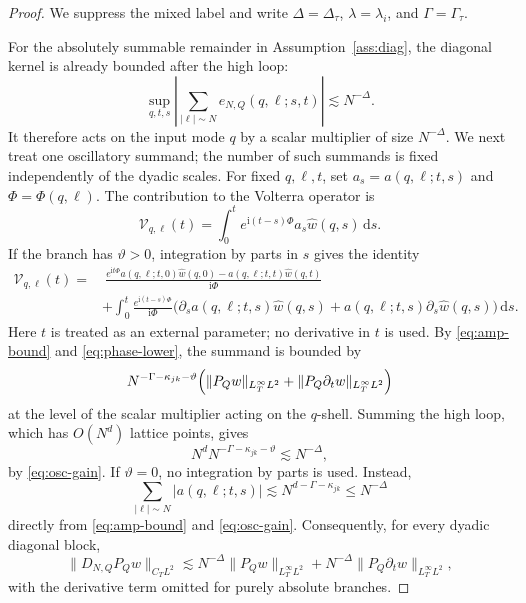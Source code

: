 \documentclass[11pt,reqno]{amsart}
\numberwithin{equation}{section}
\theoremstyle{plain}
\theoremstyle{definition}
\newcommand{\dd}{\,\mathrm d}
\newcommand{\ii}{\mathrm i}
\begin{document}
\begin{proof}
We suppress the mixed label and write \(\Delta=\Delta_\tau\), \(\lambda=\lambda_i\), and \(\Gamma=\Gamma_\tau\).

For the absolutely summable remainder in Assumption~\ref{ass:diag}, the diagonal kernel is already bounded after the high loop:
\begin{equation}\label{eq:D-rem-mult}
        \sup_{q,t,s}\left|\sum_{|\ell|\sim N}e_{N,Q}(q,\ell;s,t)\right|
        \lesssim N^{-\Delta}.
\end{equation}
It therefore acts on the input mode \(q\) by a scalar multiplier of size \(N^{-\Delta}\).  We next treat one oscillatory summand; the number of such summands is fixed independently of the dyadic scales.  For fixed \(q,\ell,t\), set \(a_s=a(q,\ell;t,s)\) and \(\Phi=\Phi(q,\ell)\).  The contribution to the Volterra operator is
\begin{equation}\label{eq:D-osc-one}
        \mathcal V_{q,\ell}(t)
        =\int_0^t e^{\ii(t-s)\Phi}a_s\widehat w(q,s)\dd s .
\end{equation}
If the branch has \(\vartheta>0\), integration by parts in \(s\) gives the identity
\begin{equation}\label{eq:D-IBP-full}
\begin{aligned}
        \mathcal V_{q,\ell}(t)
        =&\ \frac{e^{\ii t\Phi}a(q,\ell;t,0)\widehat w(q,0)
        -a(q,\ell;t,t)\widehat w(q,t)}{\ii\Phi} \\
        &+\int_0^t\frac{e^{\ii(t-s)\Phi}}{\ii\Phi}
        \bigl(\partial_sa(q,\ell;t,s)\widehat w(q,s)
        +a(q,\ell;t,s)\partial_s\widehat w(q,s)\bigr)\dd s .
\end{aligned}
\end{equation}
Here \(t\) is treated as an external parameter; no derivative in \(t\) is used.  By \eqref{eq:amp-bound} and \eqref{eq:phase-lower}, the summand is bounded by
\begin{equation}\label{eq:D-one-summand}
        N^{-\Gamma-\kappa_{jk}-\vartheta}
        \Bigl(\|P_Qw\|_{L_T^\infty L^2}
        +\|P_Q\partial_tw\|_{L_T^\infty L^2}\Bigr)
\end{equation}
at the level of the scalar multiplier acting on the \(q\)-shell.  Summing the high loop, which has \(O(N^d)\) lattice points, gives
\begin{equation}\label{eq:D-shell-size-refined}
        N^dN^{-\Gamma-\kappa_{jk}-\vartheta}
        \lesssim N^{-\Delta},
\end{equation}
by \eqref{eq:osc-gain}.  If \(\vartheta=0\), no integration by parts is used.  Instead,
\[
        \sum_{|\ell|\sim N}|a(q,\ell;t,s)|
        \lesssim N^{d-\Gamma-\kappa_{jk}}
        \le N^{-\Delta}
\]
directly from \eqref{eq:amp-bound} and \eqref{eq:osc-gain}.  Consequently,
for every dyadic diagonal block,
\begin{equation}\label{eq:D-dyadic-L2-refined}
        \|D_{N,Q}P_Qw\|_{C_TL^2}
        \lesssim
        N^{-\Delta}\|P_Qw\|_{L_T^\infty L^2}
        +N^{-\Delta}\|P_Q\partial_tw\|_{L_T^\infty L^2},
\end{equation}
with the derivative term omitted for purely absolute branches.


\end{proof}
\end{document}
